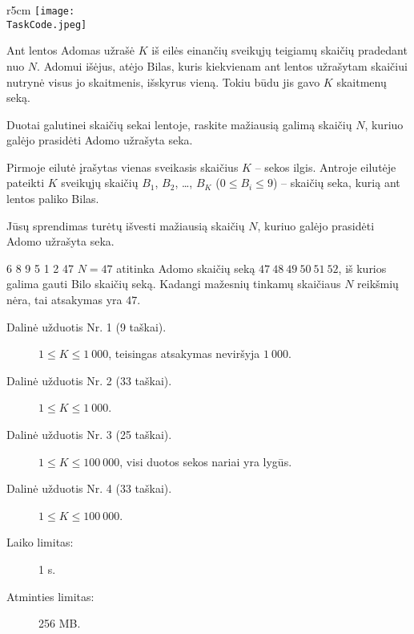 \documentclass{boi2014-lt}
\renewcommand{\TaskCode}{sequence}
\begin{document}
    \begin{wrapfigure}[5]{r}{5cm}
        \vspace{-24pt}
        \texttt{[image: \\TaskCode.jpeg]}
    \end{wrapfigure}

    Ant lentos Adomas užrašė $K$ iš eilės einančių sveikųjų teigiamų skaičių
    pradedant nuo $N$. Adomui išėjus, atėjo Bilas, kuris kiekvienam ant lentos
    užrašytam skaičiui nutrynė visus jo skaitmenis, išskyrus vieną. Tokiu būdu jis
    gavo $K$ skaitmenų seką.

    \Task
    Duotai galutinei skaičių sekai lentoje, raskite mažiausią galimą skaičių $N$,
    kuriuo galėjo prasidėti Adomo užrašyta seka.

    \Input
    Pirmoje eilutė įrašytas vienas sveikasis skaičius $K$ -- sekos ilgis. Antroje
    eilutėje pateikti $K$ sveikųjų skaičių
    $B_1$, $B_2$, \dots, $B_K$ ($0 \le B_i \le 9$) -- skaičių seka, kurią ant
    lentos paliko Bilas.

    \Output
    Jūsų sprendimas turėtų išvesti mažiausią skaičių $N$, kuriuo galėjo prasidėti
    Adomo užrašyta seka.

    \Example

    \example
    {
        6 8 9 5 1 2
    }
    {
        47
    }
    {
        $N = 47$ atitinka Adomo skaičių seką $47\ 48\ 49\ 50\ 51\ 52$, iš kurios
        galima gauti Bilo skaičių seką. Kadangi mažesnių tinkamų
        skaičiaus $N$ reikšmių nėra, tai atsakymas yra $47$.
    }

    \Scoring

    \begin{description}
        \item[Dalinė užduotis Nr. 1 (9 taškai).] $1 \le K \le 1~000$, teisingas atsakymas neviršyja $1~000$.
        \item[Dalinė užduotis Nr. 2 (33 taškai).] $1 \le K \le 1~000$.
        \item[Dalinė užduotis Nr. 3 (25 taškai).] $1 \le K \le 100~000$, visi duotos sekos nariai yra lygūs.
        \item[Dalinė užduotis Nr. 4 (33 taškai).] $1 \le K \le 100~000$.
    \end{description}

    \Constraints

    \begin{description}
        \item[Laiko limitas:] 1 s.
        \item[Atminties limitas:] 256 MB.
    \end{description}
\end{document}
